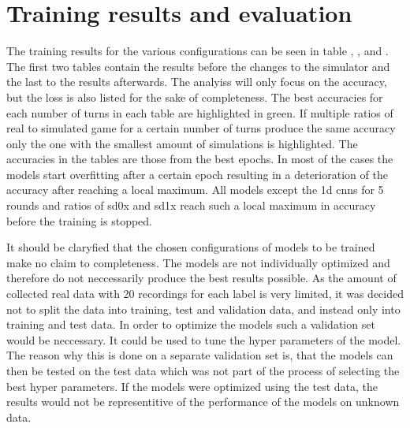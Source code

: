    
\section{Training results and evaluation}
The training results for the various configurations can be seen in table , ,  and . The first two tables contain the results before the changes to the simulator and the last to the results afterwards. The analyiss will only focus on the accuracy, but the loss is also listed for the sake of completeness. The best accuracies for each number of turns in each table are highlighted in green. If multiple ratios of real to simulated game for a certain number of turns produce the same accuracy only the one with the smallest amount of simulations is highlighted. The accuracies in the tables are those from the best epochs. In most of the cases the models start overfitting after a certain epoch resulting in a deterioration of the accuracy after reaching a local maximum. All models except the 1d cnns for 5 rounds and ratios of sd0x and sd1x reach such a local maximum in accuracy before the training is stopped. 

It should be claryfied that the chosen configurations of models to be trained make no claim to completeness. The models are not individually optimized and therefore do not neccessarily produce the best results possible. As the amount of collected real data with 20 recordings for each label is very limited, it was decided not to split the data into training, test and validation data, and instead only into training and test data. In order to optimize the models such a validation set would be neccessary. It could be used to tune the hyper parameters of the model. The reason why this is done on a separate validation set is, that the models can then be tested on the test data which was not part of the process of selecting the best hyper parameters. If the models were optimized using the test data, the results would not be representitive of the performance of the models on unknown data. 

